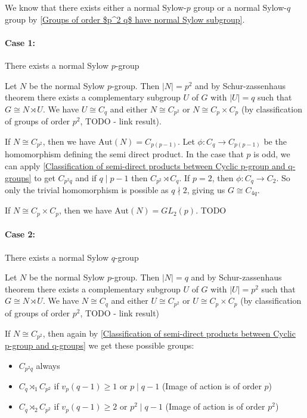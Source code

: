 We know that there exists either a normal Sylow-$p$ group or a normal Sylow-$q$ group by \ref{Groups of order $p^2 q$ have normal Sylow subgroup}.

\paragraph{Case 1:} There exists a normal Sylow $p$-group

Let $N$ be the normal Sylow $p$-group. Then $|N| = p^2$ and by Schur-zassenhaus theorem there exists a complementary subgroup $U$ of $G$ with $|U| = q$ such that $G \cong N \rtimes U$. We have $U \cong C_q$ and either $N \cong C_{p^2}$ or $N \cong C_p \times C_p$ (by classification of groups of order $p^2$, TODO - link result).

If $N \cong C_{p^2}$, then we have $\text{Aut}(N) = C_{p(p-1)}$. Let $\phi : C_q \rightarrow C_{p(p-1)}$ be the homomorphism defining the semi direct product. In the case that $p$ is odd, we can apply \ref{Classification of semi-direct products between Cyclic p-group and q-groups} to get $C_{p^2 q}$ and if $q \mid p - 1$ then $C_{p^2} \rtimes C_q$. If $p = 2$, then $\phi : C_q \rightarrow C_2$. So only the trivial homomorphism is possible as $q \nmid 2$, giving us $G \cong C_{4q}$.

If $N \cong C_p \times C_p$, then we have $\text{Aut}(N) = GL_2(p)$. TODO

\paragraph{Case 2:} There exists a normal Sylow $q$-group

Let $N$ be the normal Sylow $p$-group. Then $|N| = q$ and by Schur-zassenhaus theorem there exists a complementary subgroup $U$ of $G$ with $|U| = p^2$ such that $G \cong N \rtimes U$. We have $N \cong C_q$ and either $U \cong C_{p^2}$ or $U \cong C_p \times C_p$ (by classification of groups of order $p^2$, TODO - link result)

If $N \cong C_{p^2}$, then again by \ref{Classification of semi-direct products between Cyclic p-group and q-groups} we get these possible groups:
\begin{itemize}
    \item $C_{p^2q}$ always
    \item $C_q \rtimes_1 C_{p^2}$ if $v_p(q - 1) \geq 1$ or $p 
    \mid q - 1$ (Image of action is of order $p$)
    \item $C_q \rtimes_2 C_{p^2}$ if $v_p(q - 1) \geq 2$ or $p^2 \mid q - 1$ (Image of action is of order $p^2$)
\end{itemize}

